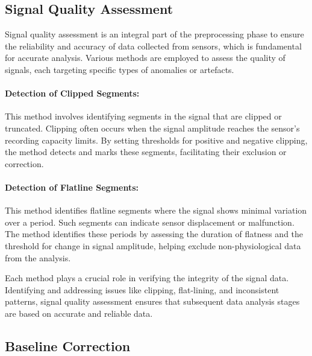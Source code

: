 \subsection*{Signal Quality Assessment }
\label{sec:signal_quality_assessment }

Signal quality assessment is an integral part of the preprocessing phase to ensure the reliability and accuracy of data collected from sensors, which is fundamental for accurate analysis. Various methods are employed to assess the quality of signals, each targeting specific types of anomalies or artefacts.

\paragraph{Detection of Clipped Segments:}
This method involves identifying segments in the signal that are clipped or truncated. Clipping often occurs when the signal amplitude reaches the sensor's recording capacity limits. By setting thresholds for positive and negative clipping, the method detects and marks these segments, facilitating their exclusion or correction.

\paragraph{Detection of Flatline Segments:}
This method identifies flatline segments where the signal shows minimal variation over a period. Such segments can indicate sensor displacement or malfunction. The method identifies these periods by assessing the duration of flatness and the threshold for change in signal amplitude, helping exclude non-physiological data from the analysis.


Each method plays a crucial role in verifying the integrity of the signal data. Identifying and addressing issues like clipping, flat-lining, and inconsistent patterns, signal quality assessment ensures that subsequent data analysis stages are based on accurate and reliable data.



\subsection*{Baseline Correction}
\label{sec:baseline_correction}

